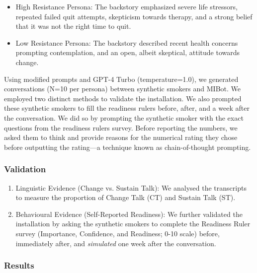 \begin{itemize}
    \item High Resistance Persona: The backstory emphasized severe life stressors, repeated failed quit attempts, skepticism towards therapy, and a strong belief that it was not the right time to quit.
    \item Low Resistance Persona: The backstory described recent health concerns prompting contemplation, and an open, albeit skeptical, attitude towards change.
\end{itemize}

Using modified prompts and GPT-4 Turbo (temperature=1.0), we generated conversations (N=10 per persona) between synthetic smokers and MIBot. We employed two distinct methods to validate the installation. We also prompted these synthetic smokers to fill the readiness rulers before, after, and a week after the conversation. We did so by prompting the synthetic smoker with the exact questions from the readiness rulers survey. Before reporting the numbers, we asked them to think and provide reasons for the numerical rating they chose before outputting the rating---a technique known as chain-of-thought prompting.

\subsubsection{Validation}

\begin{enumerate}
    \item Linguistic Evidence (Change vs. Sustain Talk): We analysed the transcripts to measure the proportion of Change Talk (CT) and Sustain Talk (ST).


    \item Behavioural Evidence (Self-Reported Readiness): We further validated the installation by asking the synthetic smokers to complete the Readiness Ruler survey (Importance, Confidence, and Readiness; 0-10 scale) before, immediately after, and \emph{simulated} one week after the conversation.

\end{enumerate}






\subsubsection{Results} 



